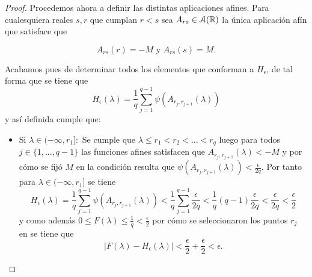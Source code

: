 \begin{proof}
    Procedemos ahora a definir las distintas aplicaciones afines. 
    Para cualesquiera reales $s,r$ que cumplan $r < s$ sea $A_{rs}\in \mathcal{A}(\mathbb{R})$ la única aplicación afín que satisface que 
    
    \begin{equation}
        A_{rs}(r) = -M \text{ y }  A_{rs}(s) = M. 
    \end{equation} 
    
    Acabamos pues de determinar todos los elementos que conforman a $H_\epsilon$, de tal forma que se tiene que
    \begin{equation}
        H_\epsilon(\lambda) = \frac{1}{q} \sum^{q-1}_{j=1} \psi( A_{r_j, r_{j+1}}(\lambda))
    \end{equation}
    y así definida cumple que: 
    \begin{itemize}
        \item Si $\lambda \in (- \infty, r_1]:$
        Se cumple que $\lambda \leq r_1 < r_2 <...< r_q$ luego  
        para todos $j \in \{1, ..., q-1\}$ las funciones afines satisfacen que 
        $A_{r_j, r_{j+1}}(\lambda) < -M$ y por cómo se fijó $M$ en la condición 
        resulta que  $\psi( A_{r_j, r_{j+1}}(\lambda)) < \frac{\epsilon}{2 q}$. Por tanto
        para $\lambda \in (- \infty, r_1]$ se tiene 
        \begin{equation}
            H_\epsilon(\lambda) = \frac{1}{q} \sum^{q-1}_{j=1} \psi( A_{r_j, r_{j+1}}(\lambda)) 
            <
            \frac{1}{q} \sum^{q-1}_{j=1}  \frac{\epsilon}{2q}
            < 
            \frac{1}{q} (q-1) \frac{\epsilon }{2q}
            <\frac{\epsilon }{2q}
            < \frac{\epsilon }{2}
        \end{equation}
        y como además $0 \leq F(\lambda) \leq \frac{1}{q} < \frac{\epsilon}{2}$ por cómo se seleccionaron los puntos $r_j$ en 
         se tiene que 
        \begin{equation}
            | F(\lambda) - H_{\epsilon}(\lambda) | < \frac{\epsilon}{2} + \frac{\epsilon}{2} < \epsilon. 
        \end{equation}


\end{itemize}
\end{proof}
